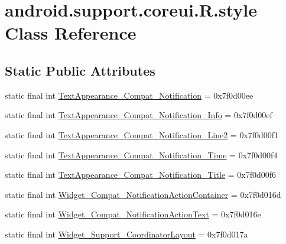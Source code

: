 \hypertarget{classandroid_1_1support_1_1coreui_1_1_r_1_1style}{}\section{android.\+support.\+coreui.\+R.\+style Class Reference}
\label{classandroid_1_1support_1_1coreui_1_1_r_1_1style}
\subsection*{Static Public Attributes}
\begin{DoxyCompactItemize}
\item 
static final int \mbox{\hyperlink{classandroid_1_1support_1_1coreui_1_1_r_1_1style_a0c6b96d4834665690ae4c899c1a719b6}{Text\+Appearance\+\_\+\+Compat\+\_\+\+Notification}} = 0x7f0d00ee
\item 
static final int \mbox{\hyperlink{classandroid_1_1support_1_1coreui_1_1_r_1_1style_aeba3bd71a8d96781afc4e9d8472481a7}{Text\+Appearance\+\_\+\+Compat\+\_\+\+Notification\+\_\+\+Info}} = 0x7f0d00ef
\item 
static final int \mbox{\hyperlink{classandroid_1_1support_1_1coreui_1_1_r_1_1style_aa5854ca296a9a914fa7c186893f8829c}{Text\+Appearance\+\_\+\+Compat\+\_\+\+Notification\+\_\+\+Line2}} = 0x7f0d00f1
\item 
static final int \mbox{\hyperlink{classandroid_1_1support_1_1coreui_1_1_r_1_1style_a835fb788c494447369e61d6839eecda1}{Text\+Appearance\+\_\+\+Compat\+\_\+\+Notification\+\_\+\+Time}} = 0x7f0d00f4
\item 
static final int \mbox{\hyperlink{classandroid_1_1support_1_1coreui_1_1_r_1_1style_a9d3e3f2d92a2b4fe044b5a3047f36d19}{Text\+Appearance\+\_\+\+Compat\+\_\+\+Notification\+\_\+\+Title}} = 0x7f0d00f6
\item 
static final int \mbox{\hyperlink{classandroid_1_1support_1_1coreui_1_1_r_1_1style_a43c6e7497150331f8f7d0863365c5478}{Widget\+\_\+\+Compat\+\_\+\+Notification\+Action\+Container}} = 0x7f0d016d
\item 
static final int \mbox{\hyperlink{classandroid_1_1support_1_1coreui_1_1_r_1_1style_a5b59f4ac1e5a41d79c19894c963d7f7a}{Widget\+\_\+\+Compat\+\_\+\+Notification\+Action\+Text}} = 0x7f0d016e
\item 
static final int \mbox{\hyperlink{classandroid_1_1support_1_1coreui_1_1_r_1_1style_ac976e78b526804e813f74ab343027d36}{Widget\+\_\+\+Support\+\_\+\+Coordinator\+Layout}} = 0x7f0d017a
\end{DoxyCompactItemize}
